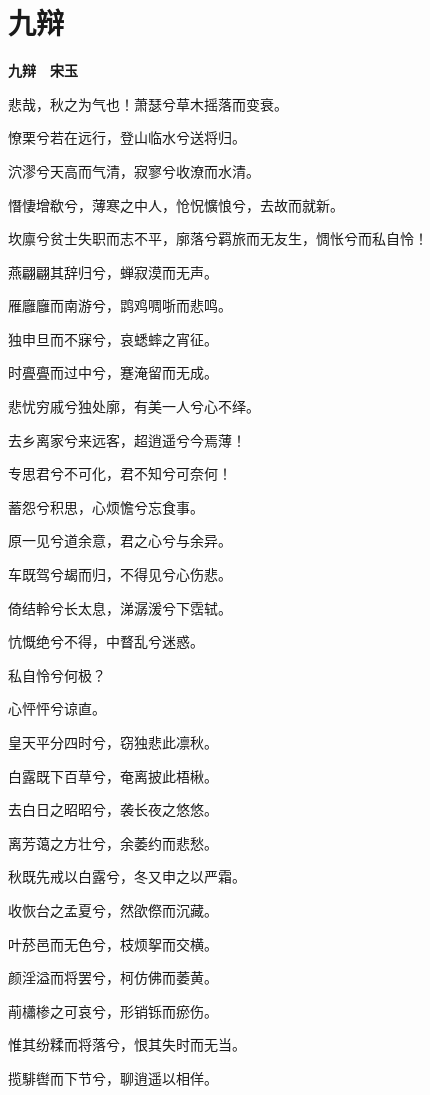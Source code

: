 \documentclass[12pt,a4paper]{ctexbook}
\begin{document}
\section{九辩}
\textbf{九辩　宋玉}\par\vspace{0.5em}
悲哉，秋之为气也！萧瑟兮草木摇落而变衰。\par
憭栗兮若在远行，登山临水兮送将归。\par
泬漻兮天高而气清，寂寥兮收潦而水清。\par
憯悽增欷兮，薄寒之中人，怆怳懭悢兮，去故而就新。\par
坎廪兮贫士失职而志不平，廓落兮羁旅而无友生，惆怅兮而私自怜！\par
燕翩翩其辞归兮，蝉寂漠而无声。\par
雁廱廱而南游兮，鹍鸡啁哳而悲鸣。\par
独申旦而不寐兮，哀蟋蟀之宵征。\par
时亹亹而过中兮，蹇淹留而无成。\par
悲忧穷戚兮独处廓，有美一人兮心不绎。\par
去乡离家兮来远客，超逍遥兮今焉薄！\par
专思君兮不可化，君不知兮可奈何！\par
蓄怨兮积思，心烦憺兮忘食事。\par
原一见兮道余意，君之心兮与余异。\par
车既驾兮朅而归，不得见兮心伤悲。\par
倚结軨兮长太息，涕潺湲兮下霑轼。\par
忼慨绝兮不得，中瞀乱兮迷惑。\par
私自怜兮何极？\par
心怦怦兮谅直。\par
皇天平分四时兮，窃独悲此凛秋。\par
白露既下百草兮，奄离披此梧楸。\par
去白日之昭昭兮，袭长夜之悠悠。\par
离芳蔼之方壮兮，余萎约而悲愁。\par
秋既先戒以白露兮，冬又申之以严霜。\par
收恢台之孟夏兮，然欿傺而沉藏。\par
叶菸邑而无色兮，枝烦挐而交横。\par
颜淫溢而将罢兮，柯仿佛而萎黄。\par
萷櫹椮之可哀兮，形销铄而瘀伤。\par
惟其纷糅而将落兮，恨其失时而无当。\par
揽騑辔而下节兮，聊逍遥以相佯。\par
\end{document}
